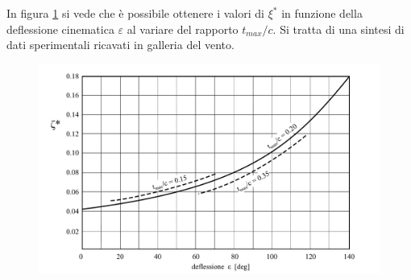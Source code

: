 In figura \ref{fig:Soderberg} si vede che è possibile ottenere i valori di $\xi^*$ in funzione della deflessione cinematica $\varepsilon$ al variare del rapporto $t_{max}/c$. Si tratta di una sintesi di dati sperimentali ricavati in galleria del vento.
\begin{figure}
\centering
  \includegraphics[width=\textwidth]{fig/Soderberg.pdf}
\caption{}
\label{fig:Soderberg}
\end{figure}
